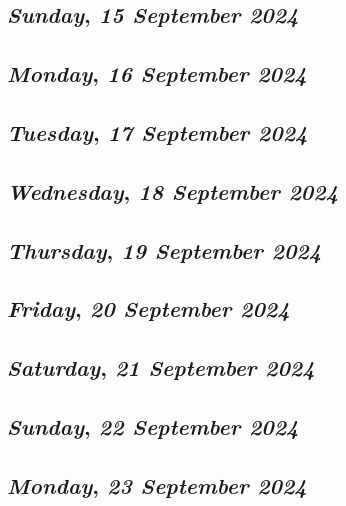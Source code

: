 \def\day{\textit{15 September 2024}}
\def\weekday{\textit{Sunday}}
\subsection*{\weekday, \day}

\def\day{\textit{16 September 2024}}
\def\weekday{\textit{Monday}}
\subsection*{\weekday, \day}

\def\day{\textit{17 September 2024}}
\def\weekday{\textit{Tuesday}}
\subsection*{\weekday, \day}

\def\day{\textit{18 September 2024}}
\def\weekday{\textit{Wednesday}}
\subsection*{\weekday, \day}

\def\day{\textit{19 September 2024}}
\def\weekday{\textit{Thursday}}
\subsection*{\weekday, \day}

\def\day{\textit{20 September 2024}}
\def\weekday{\textit{Friday}}
\subsection*{\weekday, \day}

\def\day{\textit{21 September 2024}}
\def\weekday{\textit{Saturday}}
\subsection*{\weekday, \day}

\def\day{\textit{22 September 2024}}
\def\weekday{\textit{Sunday}}
\subsection*{\weekday, \day}

\def\day{\textit{23 September 2024}}
\def\weekday{\textit{Monday}}
\subsection*{\weekday, \day}

